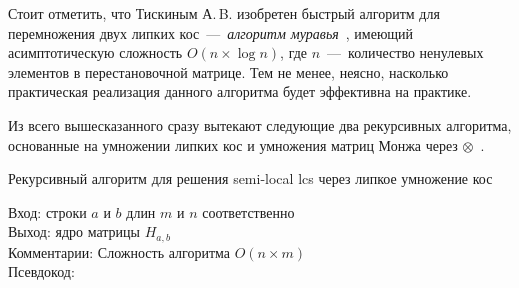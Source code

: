 Стоит отметить, что Тискиным А.\,B. изобретен быстрый алгоритм для перемножения двух липких кос~---~\emph{алгоритм муравья}~\cite{tiskin2015fast}, имеющий асимптотическую сложность $O(n \times \log n)$, где $n$~---~количество ненулевых элементов в перестановочной матрице.
Тем не менее, 
неясно, насколько практическая реализация данного алгоритма будет эффективна на практике.

Из всего вышесказанного сразу вытекают следующие два рекурсивных алгоритма, основанные на умножении липких кос и
умножения матриц Монжа через $\otimes$~\cite{tiskin2008semi}.
 \begin{algorithm}[h]
 \caption{Рекурсивный алгоритм для решения semi-local lcs через липкое умножение кос}\label{alg:ant}
 Вход: строки $a$ и $b$ длин $m$ и $n$ соответственно\\
 Выход: ядро  матрицы $H_{a,b}$\\
 Комментарии: Сложность алгоритма $O(n \times m)$\\
 Псевдокод:

 \end{algorithm}
